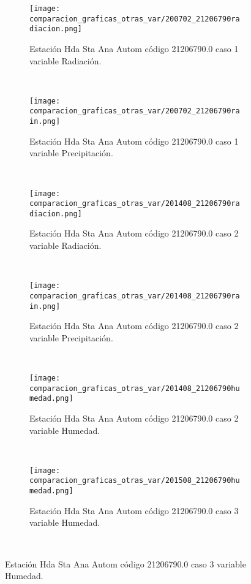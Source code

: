 \begin{figure}[H]
\centering
\begin{subfigure}[normla]{0.4\textwidth}
\caption{Estación Hda Sta Ana Autom código 21206790.0 caso 1 variable Radiación.}
\texttt{[image: comparacion\_graficas\_otras\_var/200702\_21206790radiacion.png]}
\end{subfigure}
~
\begin{subfigure}[normla]{0.4\textwidth}
\caption{Estación Hda Sta Ana Autom código 21206790.0 caso 1 variable Precipitación.}
\texttt{[image: comparacion\_graficas\_otras\_var/200702\_21206790rain.png]}
\end{subfigure}
~
\begin{subfigure}[normla]{0.4\textwidth}
\caption{Estación Hda Sta Ana Autom código 21206790.0 caso 2 variable Radiación.}
\texttt{[image: comparacion\_graficas\_otras\_var/201408\_21206790radiacion.png]}
\end{subfigure}
~
\begin{subfigure}[normla]{0.4\textwidth}
\caption{Estación Hda Sta Ana Autom código 21206790.0 caso 2 variable Precipitación.}
\texttt{[image: comparacion\_graficas\_otras\_var/201408\_21206790rain.png]}
\end{subfigure}
~
\begin{subfigure}[normla]{0.4\textwidth}
\caption{Estación Hda Sta Ana Autom código 21206790.0 caso 2 variable Humedad.}
\texttt{[image: comparacion\_graficas\_otras\_var/201408\_21206790humedad.png]}
\end{subfigure}
~
\begin{subfigure}[normla]{0.4\textwidth}
\caption{Estación Hda Sta Ana Autom código 21206790.0 caso 3 variable Humedad.}
\texttt{[image: comparacion\_graficas\_otras\_var/201508\_21206790humedad.png]}
\end{subfigure}
~
\end{figure}
           
